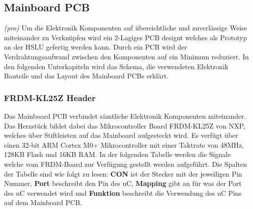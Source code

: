 \subsection{Mainboard PCB}
\textit{(pro)} Um die Elektronik Komponenten auf übersichtliche und zuverlässige Weise miteinander zu Verknüpfen wird ein 2-Lagiges PCB designt welches als Prototyp an der HSLU gefertig werden kann. Durch ein PCB wird der Verdrahtungsaufwand zwischen den Komponenten auf ein Minimum reduziert. In den folgenden Unterkapiteln wird das Schema, die verwendeten Elektronik Bauteile und das Layout des Mainboard PCBs erklärt.
\subsubsection{FRDM-KL25Z Header}
Das Mainboard PCB verbindet sämtliche Elektronik Komponenten miteinander. Das Herzstück bildet dabei das Mikrocontroller Board FRDM-KL25Z von NXP, welches über Stiftleisten auf das Mainboard aufgesteckt wird. Es verfügt über einen 32-bit ARM Cortex M0+ Mikrocontroller mit einer Taktrate von 48MHz, 128KB Flash und 16KB RAM. In der folgenden Tabelle werden die Signale welche vom FRDM-Board zur Verfügung gestellt werden aufgeführt. Die Spalten der Tabelle sind wie folgt zu lesen: \textbf{CON} ist der Stecker mit der jeweiligen Pin Nummer, \textbf{Port} beschreibt den Pin des uC, \textbf{Mapping} gibt an für was der Port des uC verwendet wird und \textbf{Funktion} beschreibt die Verwendung des uC Pins auf dem Mainboard PCB.

